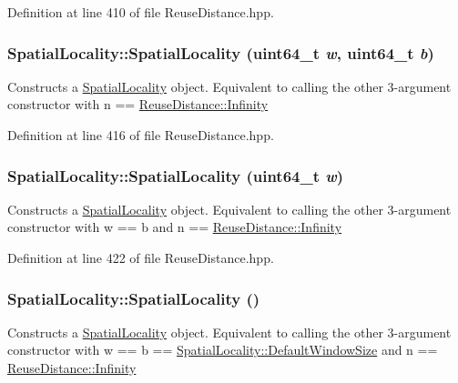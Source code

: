 Definition at line 410 of file ReuseDistance.hpp.

\hypertarget{class_spatial_locality_a908469b7cd8a92c22a8bae4e2d4c5ade}{
\subsubsection[{SpatialLocality}]{\setlength{\rightskip}{0pt plus 5cm}SpatialLocality::SpatialLocality (uint64\_\-t {\em w}, \/  uint64\_\-t {\em b})}}
\label{class_spatial_locality_a908469b7cd8a92c22a8bae4e2d4c5ade}
Constructs a \hyperlink{class_spatial_locality}{SpatialLocality} object. Equivalent to calling the other 3-\/argument constructor with n == \hyperlink{class_reuse_distance_a59f7f0ac6ad014472537619394ac7375}{ReuseDistance::Infinity} 

Definition at line 416 of file ReuseDistance.hpp.

\hypertarget{class_spatial_locality_a63d45541023cfc370b079f1011cab5b8}{
\subsubsection[{SpatialLocality}]{\setlength{\rightskip}{0pt plus 5cm}SpatialLocality::SpatialLocality (uint64\_\-t {\em w})}}
\label{class_spatial_locality_a63d45541023cfc370b079f1011cab5b8}
Constructs a \hyperlink{class_spatial_locality}{SpatialLocality} object. Equivalent to calling the other 3-\/argument constructor with w == b and n == \hyperlink{class_reuse_distance_a59f7f0ac6ad014472537619394ac7375}{ReuseDistance::Infinity} 

Definition at line 422 of file ReuseDistance.hpp.

\hypertarget{class_spatial_locality_a449d21fbe63121ea92aaf5c1e0b8cb9c}{
\subsubsection[{SpatialLocality}]{\setlength{\rightskip}{0pt plus 5cm}SpatialLocality::SpatialLocality ()}}
\label{class_spatial_locality_a449d21fbe63121ea92aaf5c1e0b8cb9c}
Constructs a \hyperlink{class_spatial_locality}{SpatialLocality} object. Equivalent to calling the other 3-\/argument constructor with w == b == \hyperlink{class_spatial_locality_a563aa890ea539ae76c942fd1827a3095}{SpatialLocality::DefaultWindowSize} and n == \hyperlink{class_reuse_distance_a59f7f0ac6ad014472537619394ac7375}{ReuseDistance::Infinity} 


